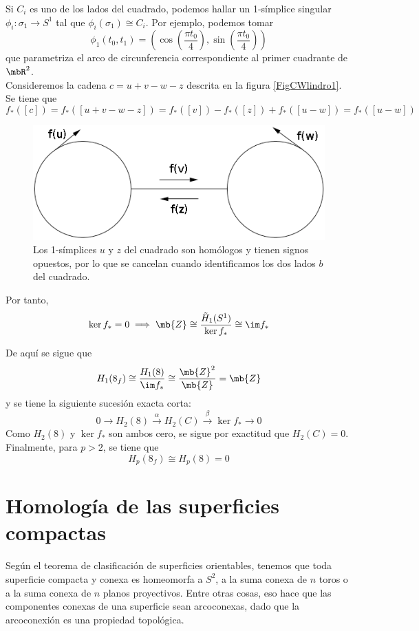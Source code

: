 Si $C_i$ es uno de los lados del cuadrado, podemos hallar un 1-símplice singular $\phi_i: \sigma_1 \longrightarrow S^1$ tal que $\phi_i(\sigma_1) \cong C_i$. Por ejemplo, podemos tomar $$\phi_1(t_0,t_1)=\left(\cos\left(\frac{\pi t_0}{4}\right),\sin\left(\frac{\pi t_0}{4}\right)\right)$$ que parametriza el arco de circunferencia correspondiente al primer cuadrante de $\mbR^2$.
\\

Consideremos la cadena $c=u+v-w-z$ descrita en la figura \ref{FigCWlindro1}. Se tiene que $$f_*([c])=f_*([u+v-w-z])=f_*([v])-f_*([z])+f_*([u-w])=f_*([u-w])$$

\begin{figure}[h]
\centering
\includegraphics[scale=0.4]{Figures/HomoCWlindro3}
\caption{\label{FigCWlindro2}Los 1-símplices $u$ y $z$ del cuadrado son homólogos y tienen signos opuestos, por lo que se cancelan cuando identificamos los dos lados $b$ del cuadrado.}
\end{figure}

Por tanto, $$\ker f_*=0 \implies \mb{Z} \cong \frac{\tilde{H}_1(S^1)}{\ker f_*} \cong \im f_*$$

De aquí se sigue que \[H_1(8_f) \cong \frac{H_1(8)}{\im f_*}\cong \frac{\mb{Z}^2}{\mb{Z}}=\mb{Z}\] y se tiene la siguiente sucesión exacta corta: \[0 \longrightarrow H_2(8) \xrightarrow{\alpha} H_2(C) \xrightarrow{\beta} \ker f_* \longrightarrow 0\] Como $H_2(8)$ y $\ker f_*$ son ambos cero, se sigue por exactitud que $H_2(C)=0$. Finalmente, para $p > 2$, se tiene que \[H_p(8_f) \cong H_p(8)=0\]

\section{Homología de las superficies compactas}
Según el teorema de clasificación de superficies orientables, tenemos que toda superficie compacta y conexa es homeomorfa a $S^2$, a la suma conexa de $n$ toros o a la suma conexa de $n$ planos proyectivos. Entre otras cosas, eso hace que las componentes conexas de una superficie sean arcoconexas, dado que la arcoconexión es una propiedad topológica.
\\

